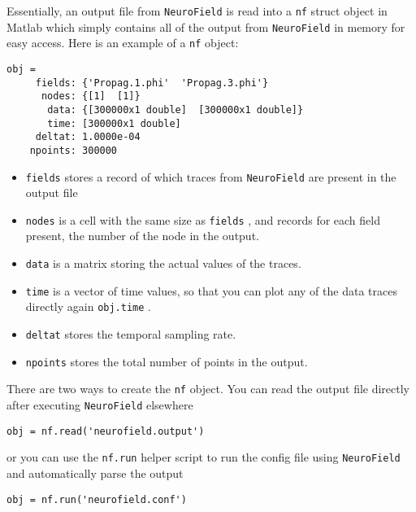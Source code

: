 \documentclass[12pt,a4paper]{article}
\newcommand{\type}[1]{{\small\small\tt #1} }
\newcommand{\NF}[0]{\type{NeuroField}}
\begin{document}
Essentially, an output file from \NF is read into a \type{nf} struct object in Matlab which simply contains all of the output from \NF in memory for easy access. Here is an example of a \type{nf} object:
\begin{lstlisting}
obj =
     fields: {'Propag.1.phi'  'Propag.3.phi'}
      nodes: {[1]  [1]}
       data: {[300000x1 double]  [300000x1 double]}
       time: [300000x1 double]
     deltat: 1.0000e-04
    npoints: 300000
\end{lstlisting}
\begin{itemize}
\item \type{fields} stores a record of which traces from \NF are present in the output file
\item \type{nodes} is a cell with the same size as \type{fields}, and records for each field present, the number of the node in the output. 
\item \type{data} is a matrix storing the actual values of the traces.
\item \type{time} is a vector of time values, so that you can plot any of the data traces directly again \type{obj.time}.
\item \type{deltat} stores the temporal sampling rate.
\item \type{npoints} stores the total number of points in the output.
\end{itemize}

There are two ways to create the \type{nf} object. You can read the output file directly after executing \NF elsewhere

\begin{lstlisting}
obj = nf.read('neurofield.output')
\end{lstlisting}

or you can use the \type{nf.run} helper script to run the config file using \NF and automatically parse the output

\begin{lstlisting}
obj = nf.run('neurofield.conf')
\end{lstlisting}

\end{document}
